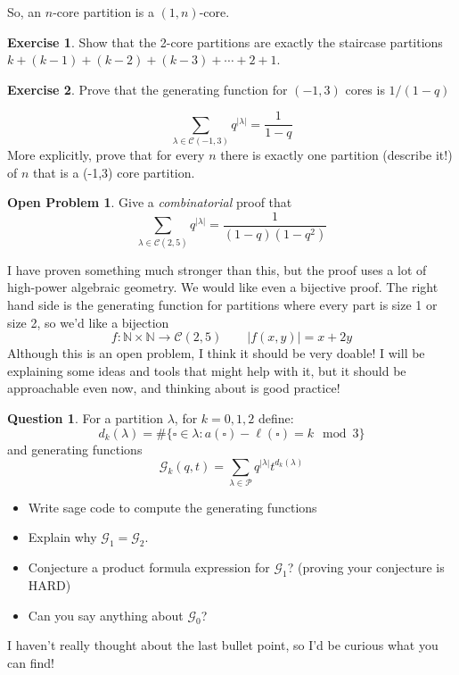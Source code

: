 \documentclass{article}
\newcommand{\CC}{\mathcal{C}}
\newcommand{\N}{\mathbb{N}}
\theoremstyle{definition}
\newtheorem{question}{Question}
\newtheorem{OpenProblem}{Open Problem}
\newtheorem{exercise}{Exercise}
\begin{document}
So, an $n$-core partition is a $(1,n)$-core.  

\begin{exercise}
Show that the 2-core partitions are exactly the staircase partitions $k+(k-1)+(k-2)+(k-3)+\cdots +2+1$.
\end{exercise}



\begin{exercise}
Prove that the generating function for $(-1,3)$ cores is $1/(1-q)$ 

$$\sum_{\lambda\in\CC(-1,3)} q^{|\lambda|}=\frac{1}{1-q}$$
More explicitly, prove that for every $n$ there is exactly one partition (describe it!) of $n$ that is a (-1,3) core partition.  
\end{exercise}

\begin{OpenProblem}
Give a \emph{combinatorial} proof that
$$\sum_{\lambda\in\CC(2,5)} q^{|\lambda|}=\frac{1}{(1-q)(1-q^2)}$$
\end{OpenProblem}

I have proven something much stronger than this, but the proof uses a lot of high-power algebraic geometry.  We would like even a bijective proof.  The right hand side is the generating function for partitions where every part is size 1 or size 2, so we'd like a bijection
$$f:\N\times\N\to\CC(2,5) \quad \quad |f(x,y)|=x+2y$$
Although this is an open problem, I think it should be very doable!  I will be explaining some ideas and tools that might help with it, but it should be approachable even now, and thinking about is good practice!



\begin{question}
For a partition $\lambda$, for $k=0,1,2$ define:
$$d_{k}(\lambda)=\#\{\square\in\lambda: a(\square)-\ell(\square)=k\mod 3\}$$
and generating functions
$$\mathcal{G}_k(q,t)=\sum_{\lambda\in\mathcal{P}}q^{|\lambda|}t^{d_k(\lambda)}$$

\begin{itemize}
\item Write sage code to compute the generating functions 
\item Explain why $\mathcal{G}_1=\mathcal{G}_2$.
\item Conjecture a product formula expression for $\mathcal{G}_1$? (proving your conjecture is HARD)
\item Can you say anything about $\mathcal{G}_0$?
\end{itemize}
I haven't really thought about the last bullet point, so I'd be curious what you can find!

\end{question}
\end{document}
